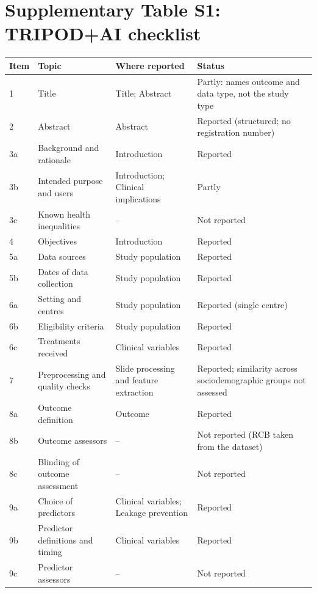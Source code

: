\documentclass[10pt,a4paper,twocolumn]{article}
\begin{document}
\clearpage
\onecolumn
\section*{Supplementary Table S1: TRIPOD+AI checklist}
\vspace{-4pt}
\small
\renewcommand{\arraystretch}{0.95}
\setlength{\tabcolsep}{4pt}
\setlength{\LTleft}{0pt}\setlength{\LTright}{0pt}
\begin{longtable}{@{}l p{} p{} p{}@{}}
\toprule
Item & Topic & Where reported & Status \\
\midrule
\endhead
1 & Title & Title; Abstract & Partly: names outcome and data type, not the study type \\
2 & Abstract & Abstract & Reported (structured; no registration number) \\
3a & Background and rationale & Introduction & Reported \\
3b & Intended purpose and users & Introduction; Clinical implications & Partly \\
3c & Known health inequalities & -- & Not reported \\
4 & Objectives & Introduction & Reported \\
5a & Data sources & Study population & Reported \\
5b & Dates of data collection & Study population & Reported \\
6a & Setting and centres & Study population & Reported (single centre) \\
6b & Eligibility criteria & Study population & Reported \\
6c & Treatments received & Clinical variables & Reported \\
7 & Preprocessing and quality checks & Slide processing and feature extraction & Reported; similarity across sociodemographic groups not assessed \\
8a & Outcome definition & Outcome & Reported \\
8b & Outcome assessors & -- & Not reported (RCB taken from the dataset) \\
8c & Blinding of outcome assessment & -- & Not reported \\
9a & Choice of predictors & Clinical variables; Leakage prevention & Reported \\
9b & Predictor definitions and timing & Clinical variables & Reported \\
9c & Predictor assessors & -- & Not reported \\

\end{longtable}
\end{document}
